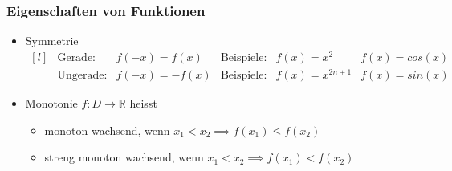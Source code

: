 \subsubsection{Eigenschaften von Funktionen}
\begin{itemize}
	
	\item Symmetrie
	\[
	\begin{matrix}[l]
		&\text{Gerade:}		&f(-x) = f(x)	&\text{Beispiele:}	&f(x) = x^2 	&f(x) = cos(x) \\
		&\text{Ungerade:}	&f(-x) = -f(x) &\text{Beispiele:} &f(x) = x^{2n+1}	&f(x) = sin(x)
	\end{matrix}
	\]
	
	\item Monotonie \newline \(f:D\rightarrow \mathbb{R}\) heisst
	\begin{itemize}
		\item monoton wachsend, wenn \(x_1<x_2 \implies f(x_1) \leq f(x_2)\)
		\item streng monoton wachsend, wenn \(x_1<x_2 \implies f(x_1) < f(x_2)\)
	\end{itemize}
	\begin{figure}[h]
\end{figure}
	
	
\end{itemize}

